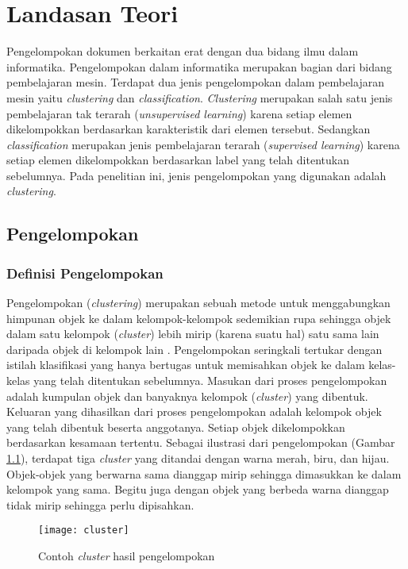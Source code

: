 \chapter{Landasan Teori}
\label{chap:teori}

Pengelompokan dokumen berkaitan erat dengan dua bidang ilmu dalam informatika. Pengelompokan dalam informatika merupakan bagian dari bidang pembelajaran mesin. Terdapat dua jenis pengelompokan dalam pembelajaran mesin yaitu \textit{clustering} dan \textit{classification}. \textit{Clustering} merupakan salah satu jenis pembelajaran tak terarah (\textit{unsupervised learning}) karena setiap elemen dikelompokkan berdasarkan karakteristik dari elemen tersebut. Sedangkan \textit{classification} merupakan jenis pembelajaran terarah (\textit{supervised learning}) karena setiap elemen dikelompokkan berdasarkan label yang telah ditentukan sebelumnya. Pada penelitian ini, jenis pengelompokan yang digunakan adalah \textit{clustering}.

\section{Pengelompokan}
\subsection{Definisi Pengelompokan}
Pengelompokan (\textit{clustering}) merupakan sebuah metode untuk menggabungkan himpunan objek ke dalam kelompok-kelompok sedemikian rupa sehingga objek dalam satu kelompok (\textit{cluster}) lebih mirip (karena suatu hal) satu sama lain daripada objek di kelompok lain \cite{gan2007data}. Pengelompokan seringkali tertukar dengan istilah klasifikasi yang hanya bertugas untuk memisahkan objek ke dalam kelas-kelas yang telah ditentukan sebelumnya. Masukan dari proses pengelompokan adalah kumpulan objek dan banyaknya kelompok (\textit{cluster}) yang dibentuk. Keluaran yang dihasilkan dari proses pengelompokan adalah kelompok objek yang telah dibentuk beserta anggotanya. Setiap objek dikelompokkan berdasarkan kesamaan tertentu. Sebagai ilustrasi dari pengelompokan (Gambar \ref{fig:cluster}), terdapat tiga \textit{cluster} yang ditandai dengan warna merah, biru, dan hijau. Objek-objek yang berwarna sama dianggap mirip sehingga dimasukkan ke dalam kelompok yang sama. Begitu juga dengan objek yang berbeda warna dianggap tidak mirip sehingga perlu dipisahkan.

\begin{figure}[h]
	\begin{center}
		\texttt{[image: cluster]}
		\caption{Contoh \textit{cluster} hasil pengelompokan}
		\label{fig:cluster}
	\end{center}
\end{figure}

